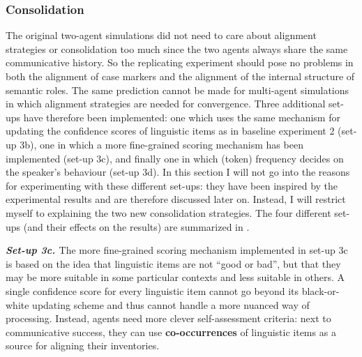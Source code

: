 \subsubsection{Consolidation}
 The original two-agent simulations did not need to care about alignment strategies or consolidation too much since the two agents always share the same communicative history. So the replicating experiment should pose no problems in both the alignment of case markers and the alignment of the internal structure of semantic roles. The same prediction cannot be made for multi-agent simulations in which alignment strategies are needed for convergence. Three additional set-ups have therefore been implemented: one which uses the same mechanism for updating the confidence scores of linguistic items as in baseline experiment 2 (set-up 3b), one in which a more fine-grained scoring mechanism has been implemented (set-up 3c), and finally one in which (token) frequency decides on the speaker's behaviour (set-up 3d). In this section I will not go into the reasons for experimenting with these different set-ups: they have been inspired by the experimental results and are therefore discussed later on. Instead, I will restrict myself to explaining the two new consolidation strategies. The four different set-ups (and their effects on the results) are summarized in .


{\bfseries {\em Set-up 3c. }}The more fine-grained scoring mechanism implemented in set-up 3c is based on the idea that linguistic items are not ``good or bad'', but that they may be more suitable in some particular contexts and less suitable in others. A single confidence score for every linguistic item cannot go beyond its black-or-white updating scheme and thus cannot handle a more nuanced way of processing. Instead, agents need more clever self-assessment criteria: next to communicative success, they can use {\bfseries co-occurrences} of linguistic items as a source for aligning their inventories. 

